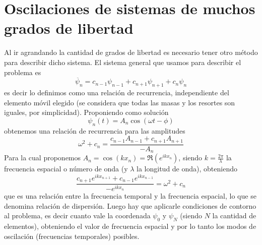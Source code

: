 \documentclass[a4paper,spanish]{article}
\numberwithin{equation}{section}
\begin{document}
\section{Oscilaciones de sistemas de muchos grados de libertad}
	  Al ir agrandando la cantidad de grados de libertad es necesario tener otro m\'etodo para describir dicho sistema. El sistema general que usamos para describir el problema es
	  \begin{equation}
		\ddot{\psi_n} = c_{n-1} \psi_{n-1} + c_{n+1} \psi_{n+1} + c_n \psi_n
		\label{eq:oscilador_recurrencia}
	  \end{equation}
	  es decir lo definimos como una relaci\'on de recurrencia, independiente del elemento m\'ovil elegido (se considera que todas las masas y los resortes son iguales, por simplicidad). Proponiendo como soluci\'on
	  \begin{equation}
		 \psi_n(t) = A_n \cos(\omega t - \phi)
		 \label{eq:oscilador_recurrencia_solucion}
	  \end{equation}
	  obtenemos una relaci\'on de recurrencia para las amplitudes
	  \begin{equation}
		 \omega^2 + c_n = \frac{c_{n-1} A_{n-1} + c_{n+1} A_{n+1}}{-A_n}
		 \label{eq:oscilador_recurrencia_relacion}
	   \end{equation}
	   Para la cual proponemos $A_n = \cos(k x_n) = \Re(e^{i k x_n})$, siendo $k = \frac{2 \pi}{\lambda}$ la frecuencia espacial o n\'umero de onda (y $\lambda$ la longitud de onda), obteniendo
	   \begin{equation}
			\frac{c_{n+1} e^{i k x_{n+1}} + c_{n-1} e^{i k x_{n-1}}}{-e^{i k x_n}} = \omega^2 + c_n
			\label{eq:oscilador_recurrencia_rel_dispersion}
	   \end{equation}
	   que es una relaci\'on entre la frecuencia temporal y la frecuencia espacial, lo que se denomina relaci\'on de dispersi\'on. 
	   Luego hay que aplicarle condiciones de contorno al problema, es decir cuanto vale la coordenada $\psi_0$ y $\psi_N$ (siendo $N$ la cantidad de elementos), obteniendo el valor de frecuencia espacial y por lo tanto los modos de oscilaci\'on (frecuencias temporales) posibles.
 
\end{document}
